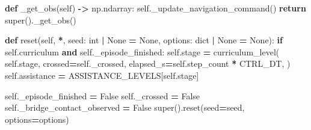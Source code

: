 \documentclass[
  chinese,
  11pt,
  letterpaper,
]{article}
\newenvironment{Shaded}{\begin{snugshade}}{\end{snugshade}}
\newcommand{\BuiltInTok}[1]{#1}
\newcommand{\ControlFlowTok}[1]{\textcolor[rgb]{0.13,0.29,0.53}{\textbf{#1}}}
\newcommand{\KeywordTok}[1]{\textcolor[rgb]{0.13,0.29,0.53}{\textbf{#1}}}
\newcommand{\NormalTok}[1]{#1}
\newcommand{\OperatorTok}[1]{\textcolor[rgb]{0.81,0.36,0.00}{\textbf{#1}}}
\newcommand{\VariableTok}[1]{\textcolor[rgb]{0.00,0.00,0.00}{#1}}
\renewenvironment{Shaded}{\par\smallskip}{\par\smallskip}
\begin{document}
\begin{Shaded}
\begin{Highlighting}[]
    \KeywordTok{def}\NormalTok{ \_get\_obs(}\VariableTok{self}\NormalTok{) }\OperatorTok{{-}\textgreater{}}\NormalTok{ np.ndarray:}
        \VariableTok{self}\NormalTok{.\_update\_navigation\_command()}
        \ControlFlowTok{return} \BuiltInTok{super}\NormalTok{().\_get\_obs()}

    \KeywordTok{def}\NormalTok{ reset(}\VariableTok{self}\NormalTok{, }\OperatorTok{*}\NormalTok{, seed: }\BuiltInTok{int} \OperatorTok{|} \VariableTok{None} \OperatorTok{=} \VariableTok{None}\NormalTok{, options: }\BuiltInTok{dict} \OperatorTok{|} \VariableTok{None} \OperatorTok{=} \VariableTok{None}\NormalTok{):}
        \ControlFlowTok{if} \VariableTok{self}\NormalTok{.curriculum }\KeywordTok{and} \VariableTok{self}\NormalTok{.\_episode\_finished:}
            \VariableTok{self}\NormalTok{.stage }\OperatorTok{=}\NormalTok{ curriculum\_level(}
                \VariableTok{self}\NormalTok{.stage,}
\NormalTok{                crossed}\OperatorTok{=}\VariableTok{self}\NormalTok{.\_crossed,}
\NormalTok{                elapsed\_s}\OperatorTok{=}\VariableTok{self}\NormalTok{.step\_count }\OperatorTok{*}\NormalTok{ CTRL\_DT,}
\NormalTok{            )}
            \VariableTok{self}\NormalTok{.assistance }\OperatorTok{=}\NormalTok{ ASSISTANCE\_LEVELS[}\VariableTok{self}\NormalTok{.stage]}

        \VariableTok{self}\NormalTok{.\_episode\_finished }\OperatorTok{=} \VariableTok{False}
        \VariableTok{self}\NormalTok{.\_crossed }\OperatorTok{=} \VariableTok{False}
        \VariableTok{self}\NormalTok{.\_bridge\_contact\_observed }\OperatorTok{=} \VariableTok{False}
        \BuiltInTok{super}\NormalTok{().reset(seed}\OperatorTok{=}\NormalTok{seed, options}\OperatorTok{=}\NormalTok{options)}


\end{Highlighting}
\end{Shaded}
\end{document}
